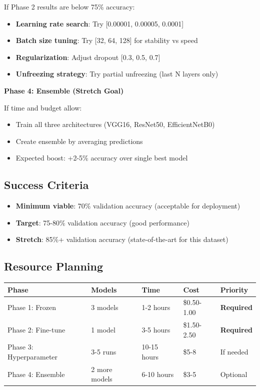 \documentclass[
  letterpaper,
  DIV=11,
  numbers=noendperiod]{scrartcl}
\providecommand{\tightlist}{%
  \setlength{\itemsep}{0pt}\setlength{\parskip}{0pt}}
\begin{document}
If Phase 2 results are below 75\% accuracy:

\begin{itemize}
\tightlist
\item
  \textbf{Learning rate search}: Try {[}0.00001, 0.00005, 0.0001{]}
\item
  \textbf{Batch size tuning}: Try {[}32, 64, 128{]} for stability vs
  speed
\item
  \textbf{Regularization}: Adjust dropout {[}0.3, 0.5, 0.7{]}
\item
  \textbf{Unfreezing strategy}: Try partial unfreezing (last N layers
  only)
\end{itemize}

\textbf{Phase 4: Ensemble (Stretch Goal)}

If time and budget allow:

\begin{itemize}
\tightlist
\item
  Train all three architectures (VGG16, ResNet50, EfficientNetB0)
\item
  Create ensemble by averaging predictions
\item
  Expected boost: +2-5\% accuracy over single best model
\end{itemize}

\subsection{Success Criteria}\label{success-criteria}

\begin{itemize}
\tightlist
\item
  \textbf{Minimum viable}: 70\% validation accuracy (acceptable for
  deployment)
\item
  \textbf{Target}: 75-80\% validation accuracy (good performance)
\item
  \textbf{Stretch}: 85\%+ validation accuracy (state-of-the-art for this
  dataset)
\end{itemize}

\subsection{Resource Planning}\label{resource-planning}

\begin{longtable}[]{@{}lllll@{}}
\toprule\noalign{}
Phase & Models & Time & Cost & Priority \\
\midrule\noalign{}
\endhead
\bottomrule\noalign{}
\endlastfoot
Phase 1: Frozen & 3 models & 1-2 hours & \$0.50-1.00 &
\textbf{Required} \\
Phase 2: Fine-tune & 1 model & 3-5 hours & \$1.50-2.50 &
\textbf{Required} \\
Phase 3: Hyperparameter & 3-5 runs & 10-15 hours & \$5-8 & If needed \\
Phase 4: Ensemble & 2 more models & 6-10 hours & \$3-5 & Optional \\
\end{longtable}
\end{document}
